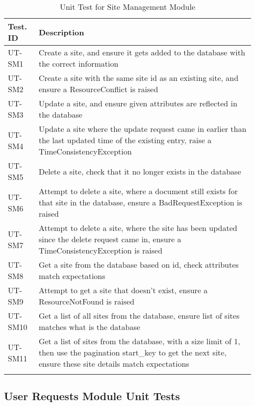 \documentclass[12pt, titlepage]{article}
\begin{document}
\begin{longtable}{|m{2cm}|m{10cm}|}
  \hline
  \textbf{Test. ID} & \textbf{Description}\\ \hline
  UT-SM1 & Create a site, and ensure it gets added to the
  database with the correct information\\ \hline
  UT-SM2 & Create a site with the same site id as an existing site,
  and ensure a ResourceConflict is raised\\ \hline
  UT-SM3 & Update a site, and ensure given attributes are reflected
  in the database \\ \hline
  UT-SM4 & Update a site where the update request came in earlier
  than the last updated time of the existing entry, raise a
  TimeConsistencyException\\ \hline
  UT-SM5 & Delete a site, check that it no longer exists in the
  database\\ \hline
  UT-SM6 & Attempt to delete a site, where a document still exists
  for that site in the database, ensure a BadRequestException is raised\\ \hline
  UT-SM7 & Attempt to delete a site, where the site has been updated
  since the delete request came in, ensure a TimeConsistencyException
  is raised\\ \hline
  UT-SM8 & Get a site from the database based on id, check attributes
  match expectations\\ \hline
  UT-SM9 & Attempt to get a site that doesn't exist, ensure a
  ResourceNotFound is raised\\ \hline
  UT-SM10 & Get a list of all sites from the database, ensure list of
  sites matches what is the database\\ \hline
  UT-SM11 & Get a list of sites from the database, with a size limit
  of 1, then use the pagination start\_key to get the next site,
  ensure these site details match expectations\\ \hline
  \caption{Unit Test for Site Management Module}
\end{longtable}

\subsection{User Requests Module Unit Tests}
\end{document}
